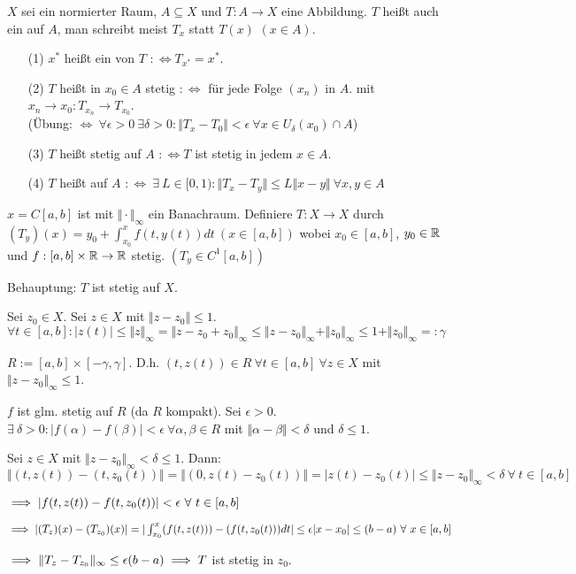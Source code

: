 \documentclass{article}
\begin{document}
\begin{definition}[Operator]
 $X$ sei ein normierter Raum, $A \subseteq X$ und $T: A \to X$ eine Abbildung. $T$ heißt auch ein  auf $A$, man schreibt meist $T_x$ statt $T(x)$ $(x \in A)$.
\begin{itemize}
	\item[(1)] $x^*$ heißt ein  von $T$ $: \Leftrightarrow T_{x^*} = x^*$.
	\item[(2)] $T$ heißt in $x_0 \in A$ stetig $: \Leftrightarrow $ für jede Folge $(x_n)$ in 
	$A$. mit $x_n \to x_0: T_{x_n} \to T_{x_0}$. \\
	(Übung: $\Leftrightarrow\ \forall \epsilon > 0 \ \exists \delta > 0: \Vert T_x - T_0 \Vert <
	\epsilon\ \forall x \in U_{\delta}(x_0) \cap A$)
	\item[(3)] $T$ heißt stetig auf $A$ $: \Leftrightarrow T$ ist stetig in jedem $x \in A$.
	\item[(4)] $T$ heißt auf $A$  $: \Leftrightarrow\ \exists \ L \in
	[0,1): \Vert T_x - T_y \Vert \le L \Vert x-y \Vert\ \forall x,y \in A$
\end{itemize}
\end{definition}

\begin{beispiel}[Wichtig!]
$x=C[a,b]$  ist mit $\Vert \cdot \Vert_{\infty}$ ein Banachraum. Definiere $T: X \to X$ durch $(T_y)(x) = y_0 + \int_{x_0}^xf(t,y(t))dt \ (x \in [a,b])$ wobei $x_0 \in [a,b]$, $y_0 \in \mathbb{R}$ und $f:[a,b] \times \mathbb{R} \to \mathbb{R}$ stetig. $(T_y \in C^1[a,b])$

Behauptung: $T$ ist stetig auf $X$.
\end{beispiel}
\begin{beweis}
Sei $z_0 \in X$. Sei $z \in X$ mit $\Vert z - z_0 \Vert \le 1$. $\forall t \in [a,b]: |z(t)| \le \Vert z \Vert_{\infty} = \Vert z - z_0 + z_0 \Vert _{\infty} \le \Vert z - z_0 \Vert _{\infty} + \Vert z_0 \Vert_{\infty} \le 1 + \Vert z_0 \Vert _{\infty} =: \gamma$

$R:= [a,b] \times [-\gamma, \gamma]$. D.h. $(t,z(t)) \in R\ \forall t \in [a,b]\ \forall z \in X$ mit $\Vert z - z_0 \Vert _{\infty} \le 1$.

$f$ ist glm. stetig auf $R$ (da $R$ kompakt). Sei $\epsilon > 0$. $\exists \ \delta > 0: | f(\alpha) - f(\beta) | < \epsilon\ \forall \alpha, \beta \in R$ mit $\Vert \alpha - \beta \Vert < \delta$ und $\delta \le 1$.

Sei $z \in X$ mit $\Vert z - z_0 \Vert_{\infty} < \delta \le 1$. Dann: $\Vert(t,z(t)) - (t,z_0(t)) \Vert = \Vert (0, z(t) - z_0(t)) \Vert = | z(t) - z_0(t) | \le \Vert z - z_0 \Vert_{\infty} < \delta \ \forall \ t \in [a,b]$

$\implies |f(t,z(t)) - f(t,z_0(t))| < \epsilon \ \forall \ t \in [a,b]$

$\implies |(T_z)(x) - (T_{z_0})(x)| = | \int_{x_0}^x (f(t,z(t))) - (f(t,z_0(t))) dt | \le \epsilon |x-x_0| \le (b-a)\ \forall \ x \in [a,b]$

$\implies \Vert T_z - T_{z_0} \Vert_{\infty} \le \epsilon(b-a) \implies T$ ist stetig in $z_0$.
\end{beweis}
\end{document}
